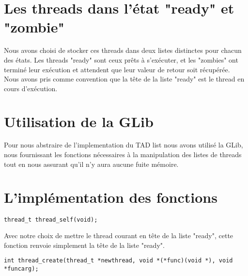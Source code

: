 \documentclass[12pt]{article}
\begin{document}
\section {Les threads dans l'état "ready" et "zombie"}

Nous avons choisi de stocker ces threads dans deux listes distinctes
pour chacun des états. Les threads "ready" sont ceux prêts à
s'exécuter, et les "zombies" ont terminé leur exécution et attendent
que leur valeur de retour soit récupérée.\\
Nous avons pris comme convention que la tête de la liste "ready" est
le thread en cours d'exécution.

\section {Utilisation de la GLib}

Pour nous abstraire de l'implementation du TAD list nous avons utilisé
la GLib, nous fournissant les fonctions nécessaires à la manipulation
des listes de threads tout en nous assurant qu'il n'y aura aucune
fuite mémoire.

\section {L'implémentation des fonctions}

\begin{verbatim}
thread_t thread_self(void);
\end{verbatim}
Avec notre choix de mettre le thread courant en tête de la liste "ready", 
cette fonction renvoie simplement la tête de la liste "ready".
~~\\
\begin{verbatim}
int thread_create(thread_t *newthread, void *(*func)(void *), void *funcarg);
\end{verbatim}
\end{document}
